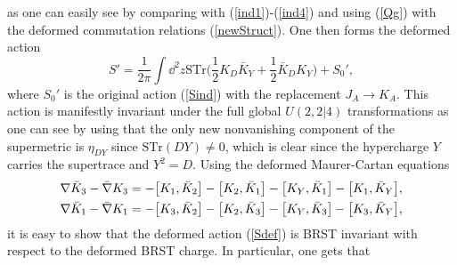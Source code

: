 \documentclass[12pt]{article}
\def\be{\begin{equation}}
\def\ee{\end{equation}}
\numberwithin{equation}{section}
\begin{document}
as one can easily see by comparing with (\ref{ind1})-(\ref{ind4}) and using (\ref{Qg}) with the deformed commutation relations (\ref{newStruct}). One then forms the deformed action
\be
S' = \frac{1}{2\pi} \int \dd^2z \text{STr}\big(\frac{1}{2} K_D \bar{K}_Y + \frac{1}{2}\bar{K}_D K_Y\big) + S_0',
\label{Sdef}
\ee
where $S_0'$ is the original action (\ref{Sind}) with the replacement $J_A \to K_A$. This action is manifestly invariant under the full global $U(2,2|4)$ transformations as one can see by using that the only new nonvanishing component of the supermetric is $\eta_{DY}$ since $\text{STr}(D Y) \neq 0$, which is clear since the hypercharge $Y$ carries the supertrace and $Y^2 = D$. Using the deformed Maurer-Cartan equations
\begin{align}
	&\nabla \bar{K}_3 - \bar{\nabla} K_3 = -\comm{K_1}{\bar{K}_2} - \comm{K_2}{\bar{K}_1} - \comm{K_Y}{\bar{K}_1} - \comm{K_1}{\bar{K}_Y}, \\
	&\nabla \bar{K}_1 - \bar{\nabla} K_1 =-\comm{K_3}{\bar{K}_2} - \comm{K_2}{\bar{K}_3} - \comm{K_Y}{\bar{K}_3} - \comm{K_3}{\bar{K}_Y},
\end{align}
it is easy to show that the deformed action (\ref{Sdef}) is BRST invariant with respect to the deformed BRST charge. In particular, one gets that
\end{document}
